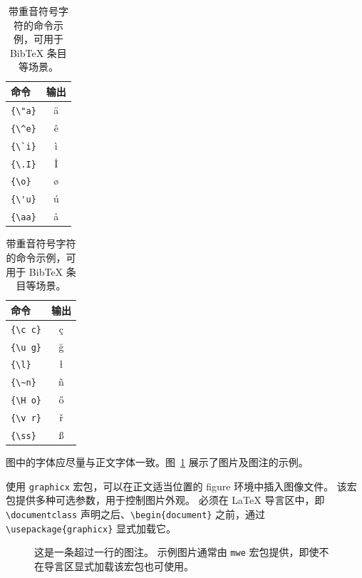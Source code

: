 \documentclass[11pt]{article}
\begin{document}
\begin{table}
  \centering
  \begin{tabular}{lc}
    \hline
    \textbf{命令} & \textbf{输出} \\
    \hline
    \verb|{\"a}|     & {\"a}           \\
    \verb|{\^e}|     & {\^e}           \\
    \verb|{\`i}|     & {\`i}           \\
    \verb|{\.I}|     & {\.I}           \\
    \verb|{\o}|      & {\o}            \\
    \verb|{\'u}|     & {\'u}           \\
    \verb|{\aa}|     & {\aa}           \\\hline
  \end{tabular}
  \begin{tabular}{lc}
    \hline
    \textbf{命令} & \textbf{输出} \\
    \hline
    \verb|{\c c}|    & {\c c}          \\
    \verb|{\u g}|    & {\u g}          \\
    \verb|{\l}|      & {\l}            \\
    \verb|{\~n}|     & {\~n}           \\
    \verb|{\H o}|    & {\H o}          \\
    \verb|{\v r}|    & {\v r}          \\
    \verb|{\ss}|     & {\ss}           \\
    \hline
  \end{tabular}
  \caption{带重音符号字符的命令示例，可用于 Bib\TeX{} 条目等场景。}
  \label{tab:accents}
\end{table}

图中的字体应尽量与正文字体一致。图~\ref{fig:experiments} 展示了图片及图注的示例。

使用 \verb|graphicx| 宏包，可以在正文适当位置的 figure 环境中插入图像文件。
该宏包提供多种可选参数，用于控制图片外观。
必须在 \LaTeX{} 导言区中，即 \verb|\documentclass| 声明之后、\verb|\begin{document}| 之前，通过 \verb|\usepackage{graphicx}| 显式加载它。

\begin{figure}[t]
  \caption{这是一条超过一行的图注。
    示例图片通常由 \texttt{mwe} 宏包提供，即使不在导言区显式加载该宏包也可使用。}
  \label{fig:experiments}
\end{figure}
\end{document}

